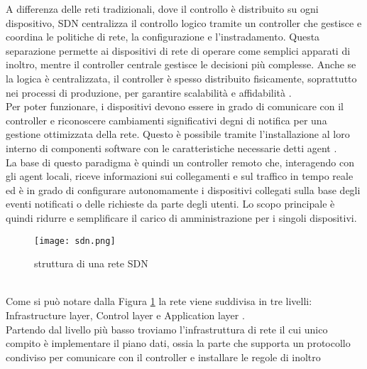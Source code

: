 A differenza delle reti tradizionali, dove il controllo è distribuito su ogni dispositivo, SDN centralizza il controllo logico tramite un controller che gestisce e coordina le politiche di rete, la configurazione e l'instradamento.
Questa separazione permette ai dispositivi di rete di operare come semplici apparati di inoltro, mentre il controller centrale gestisce le decisioni più complesse.%
Anche se la logica è centralizzata, il controller è spesso distribuito fisicamente, soprattutto nei processi di produzione, per garantire scalabilità e affidabilità \cite{sdnlayers}.
\\Per poter funzionare, i dispositivi devono essere in grado di comunicare con il controller e riconoscere cambiamenti significativi degni di notifica per una gestione ottimizzata della rete. %
Questo è possibile tramite l'installazione al loro interno di componenti software con le caratteristiche necessarie
detti agent \cite{tesiSDN:2017}.
\\La base di questo paradigma è quindi un controller remoto che, interagendo con gli agent
locali, riceve informazioni sui collegamenti e sul traffico in tempo reale ed è in grado di
configurare autonomamente i dispositivi collegati sulla base degli eventi notificati o delle richieste da parte degli utenti. Lo scopo
principale è quindi ridurre e semplificare il carico di amministrazione per i singoli dispositivi.
\begin{figure}[h]
    \centering
   \texttt{[image: sdn.png]}
    \caption{struttura di una rete SDN \cite{fotosdn}}
    \label{fig:sdnF}
\end{figure}
\\Come si può notare dalla Figura \ref{fig:sdnF} la rete viene suddivisa in tre livelli: Infrastructure layer, Control layer e Application layer \cite{sdnlayers}.
\\Partendo dal livello più basso troviamo l'infrastruttura di rete il cui unico compito è implementare il piano dati, ossia la parte che supporta un protocollo condiviso per comunicare con il controller e installare le regole di inoltro
